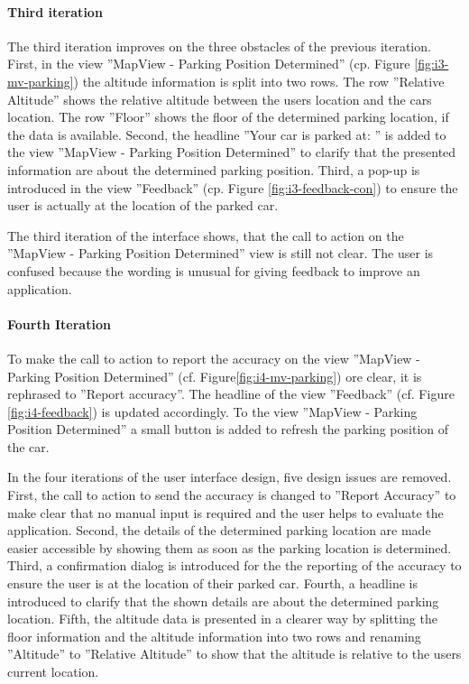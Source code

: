 \paragraph{Third iteration}

The third iteration improves on the three obstacles of the previous iteration. 
First, in the view ''MapView - Parking Position Determined'' (cp. Figure \ref{fig:i3-mv-parking}) the altitude information is split  into two rows. The row ''Relative Altitude'' shows the relative altitude between the users location and the cars location. The row ''Floor'' shows the floor of the determined parking location, if the data is available. Second, the headline ''Your car is parked at: '' is added to the view ''MapView - Parking Position Determined'' to clarify that the presented information are about the determined parking position. Third, a pop-up is introduced in the view ''Feedback'' (cp. Figure \ref{fig:i3-feedback-con}) to ensure the user is actually at the location of the parked car. 

The third iteration of the interface shows, that the call to action on the ''MapView - Parking Position Determined'' view is still not clear. The user is confused because the wording is unusual for giving feedback to improve an application.

\paragraph{Fourth Iteration}

To make the call to action to report the accuracy on the view ''MapView - Parking Position Determined'' (cf. Figure\ref{fig:i4-mv-parking}) ore clear, it is rephrased to ''Report accuracy''. The headline of the view ''Feedback'' (cf. Figure \ref{fig:i4-feedback}) is updated accordingly. To the view ''MapView - Parking Position Determined'' a small button is added to refresh the parking position of the car. 


In the four iterations of the user interface design, five design issues are removed. First, the call to action to send the accuracy is changed to ''Report Accuracy'' to make clear that no manual input is required and the user helps to evaluate the application. Second, the details of the determined parking location are made easier accessible by showing them as soon as the parking location is determined. Third, a confirmation dialog is introduced for the the reporting of the accuracy to ensure the user is at the location of their parked car. Fourth, a headline is introduced to clarify that the shown details are about the determined parking location. Fifth, the altitude data is presented in a clearer way by splitting the floor information and the altitude information into two rows and renaming ''Altitude'' to ''Relative Altitude'' to show that the altitude is relative to the users current location.


